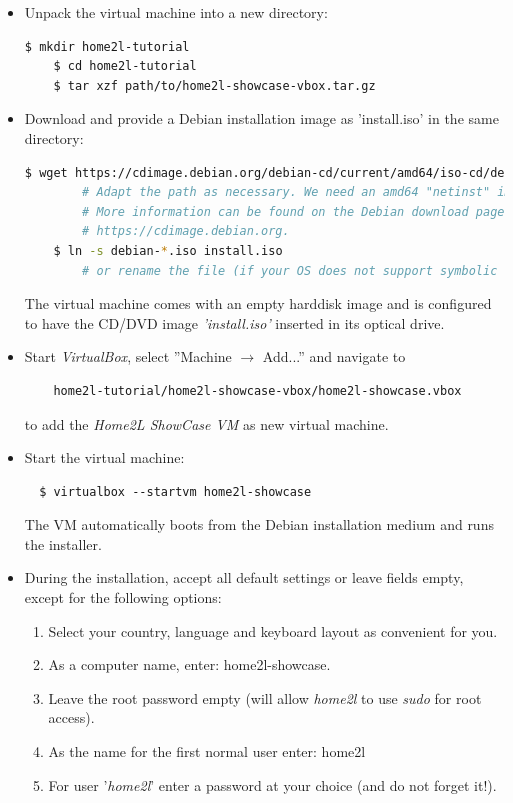 \documentclass[12pt,english,parskip=half,headheight=19pt]{scrreprt}
\newcommand{\lstf}[1]{\colorbox{lstbackground}{\ttfamily\footnotesize#1}}
\begin{document}
\begin{itemize}[$\blacktriangleright$]

\item
  Unpack the virtual machine into a new directory:
  \begin{lstlisting}[language=bash]
    $ mkdir home2l-tutorial
    $ cd home2l-tutorial
    $ tar xzf path/to/home2l-showcase-vbox.tar.gz
  \end{lstlisting}

\item
  Download and provide a Debian installation image as 'install.iso' in the same directory:
  \begin{lstlisting}[language=bash]
    $ wget https://cdimage.debian.org/debian-cd/current/amd64/iso-cd/debian-13.0.0-amd64-netinst.iso
        # Adapt the path as necessary. We need an amd64 "netinst" image.
        # More information can be found on the Debian download page at
        # https://cdimage.debian.org.
    $ ln -s debian-*.iso install.iso
        # or rename the file (if your OS does not support symbolic links)
  \end{lstlisting}

  The virtual machine comes with an empty harddisk image and is configured
  to have the CD/DVD image \textit{'install.iso'} inserted in its optical drive.

\item
  Start \textit{VirtualBox}, select ''Machine $\rightarrow$ Add...'' and navigate to
  \begin{lstlisting}
    home2l-tutorial/home2l-showcase-vbox/home2l-showcase.vbox
  \end{lstlisting}
  to add the \textit{Home2L ShowCase VM} as new virtual machine.

\item
  Start the virtual machine:
  \begin{lstlisting}
  $ virtualbox --startvm home2l-showcase
  \end{lstlisting}
  The VM automatically boots from the Debian installation medium and runs the installer.

\item
  During the installation, accept all default settings or leave fields empty,
  except for the following options:
  \begin{enumerate}
    \item Select your country, language and keyboard layout as convenient for you.
    \item As a computer name, enter: \lstf{home2l-showcase}.
    \item Leave the root password empty (will allow \textit{home2l} to use \textit{sudo} for root access).
    \item As the name for the first normal user enter: \lstf{home2l}
    \item For user '\textit{home2l}' enter a password at your choice (and do not forget it!).
  \end{enumerate}


\end{itemize}
\end{document}
